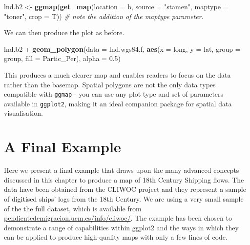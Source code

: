 \documentclass[]{article}
\newenvironment{Shaded}{}{}
\newcommand{\KeywordTok}[1]{\textcolor[rgb]{0.00,0.44,0.13}{\textbf{{#1}}}}
\newcommand{\DataTypeTok}[1]{\textcolor[rgb]{0.56,0.13,0.00}{{#1}}}
\newcommand{\FloatTok}[1]{\textcolor[rgb]{0.25,0.63,0.44}{{#1}}}
\newcommand{\StringTok}[1]{\textcolor[rgb]{0.25,0.44,0.63}{{#1}}}
\newcommand{\CommentTok}[1]{\textcolor[rgb]{0.38,0.63,0.69}{\textit{{#1}}}}
\newcommand{\NormalTok}[1]{{#1}}
\begin{document}
\begin{Shaded}
\begin{Highlighting}[]
\NormalTok{lnd.b2 <- }\KeywordTok{ggmap}\NormalTok{(}\KeywordTok{get_map}\NormalTok{(}\DataTypeTok{location =} \NormalTok{b, }\DataTypeTok{source =} \StringTok{"stamen"}\NormalTok{, }\DataTypeTok{maptype =} \StringTok{"toner"}\NormalTok{, }
    \DataTypeTok{crop =} \NormalTok{T))  }\CommentTok{# note the addition of the maptype parameter.}
\end{Highlighting}
\end{Shaded}

We can then produce the plot as before.

\begin{Shaded}
\begin{Highlighting}[]
\NormalTok{lnd.b2 + }\KeywordTok{geom_polygon}\NormalTok{(}\DataTypeTok{data =} \NormalTok{lnd.wgs84.f, }\KeywordTok{aes}\NormalTok{(}\DataTypeTok{x =} \NormalTok{long, }\DataTypeTok{y =} \NormalTok{lat, }\DataTypeTok{group =} \NormalTok{group, }
    \DataTypeTok{fill =} \NormalTok{Partic_Per), }\DataTypeTok{alpha =} \FloatTok{0.5}\NormalTok{)}
\end{Highlighting}
\end{Shaded}

This produces a much clearer map and enables readers to focus on the
data rather than the basemap. Spatial polygons are not the only data
types compatible with \texttt{ggmap} - you can use any plot type and set
of parameters available in \texttt{ggplot2}, making it an ideal
companion package for spatial data visualisation.

\section{A Final Example}

Here we present a final example that draws upon the many advanced
concepts discussed in this chapter to produce a map of 18th Century
Shipping flows. The data have been obtained from the CLIWOC project and
they represent a sample of digitised ships' logs from the 18th Century.
We are using a very small sample of the the full dataset, which is
available
from\\\href{http://pendientedemigracion.ucm.es/info/cliwoc/}{pendientedemigracion.ucm.es/info/cliwoc/}.
The example has been chosen to demonstrate a range of capabilities
within ggplot2 and the ways in which they can be applied to produce
high-quality maps with only a few lines of code.
\end{document}
